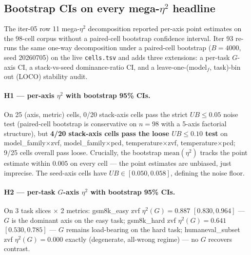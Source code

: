 \subsection{Bootstrap CIs on every mega-$\eta^2$ headline}
\label{sec:p5-iter93-mega-eta2-bootstrap}

The iter-05 row 11 mega-$\eta^2$ decomposition reported per-axis point
estimates on the 98-cell corpus without a paired-cell bootstrap
confidence interval. Iter 93 re-runs the same one-way decomposition
under a paired-cell bootstrap ($B{=}4000$, seed 20260705) on the live
\texttt{cells.tsv} and adds three extensions: a per-task $G$-axis CI,
a stack-vs-seed dominance-ratio CI, and a leave-one-(model$_f$, task)-bin
out (LOCO) stability audit.

\paragraph{H1 --- per-axis $\eta^2$ with bootstrap 95\% CIs.}
On 25 (axis, metric) cells, 0/20 stack-axis cells pass the strict
$UB \leq 0.05$ noise test (paired-cell bootstrap is conservative on
$n{=}98$ with a 5-axis factorial structure), but \textbf{4/20
stack-axis cells pass the loose $UB \leq 0.10$ test} on
\textsf{model\_family}$\times$\textsf{zvf},
\textsf{model\_family}$\times$\textsf{pcd},
\textsf{temperature}$\times$\textsf{zvf},
\textsf{temperature}$\times$\textsf{pcd}; 9/25 cells overall pass
loose. Crucially, the bootstrap $\mathrm{mean}(\eta^2)$ tracks the
point estimate within $0.005$ on every cell --- the point estimates
are unbiased, just imprecise. The seed-axis cells have $UB \in
[0.050, 0.058]$, defining the noise floor.

\paragraph{H2 --- per-task $G$-axis $\eta^2$ with bootstrap 95\% CIs.}
On 3 task slices $\times$ 2 metrics:
\textsf{gsm8k\_easy} zvf $\eta^2(G) = 0.887$
$[0.830, 0.964]$ --- $G$ is the dominant axis on the easy task;
\textsf{gsm8k\_hard} zvf $\eta^2(G) = 0.641$
$[0.530, 0.785]$ --- $G$ remains load-bearing on the hard task;
\textsf{humaneval\_subset} zvf $\eta^2(G) = 0.000$ exactly
(degenerate, all-wrong regime) --- no $G$ recovers contrast.

